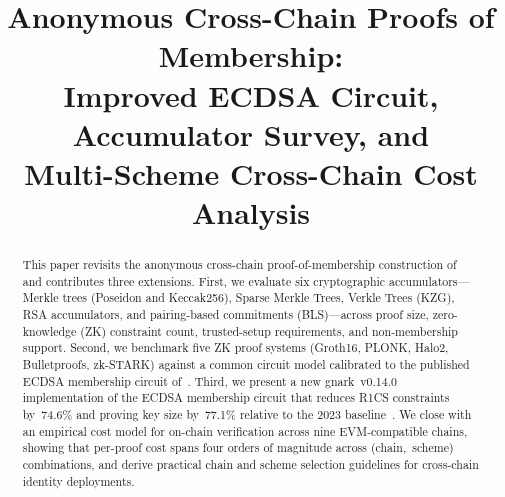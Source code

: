 \documentclass[conference]{IEEEtran}
\begin{document}
\title{Anonymous Cross-Chain Proofs of Membership:\\
Improved ECDSA Circuit, Accumulator Survey, and\\
Multi-Scheme Cross-Chain Cost Analysis}

\author{
  \and
}

\maketitle

\begin{abstract}
This paper revisits the anonymous cross-chain proof-of-membership
construction of~\cite{Kravchenko2023} and contributes three extensions.
First, we evaluate six cryptographic accumulators---Merkle trees
(Poseidon and Keccak256), Sparse Merkle Trees, Verkle Trees (KZG),
RSA accumulators, and pairing-based commitments (BLS)---across
proof size, zero-knowledge (ZK) constraint count, trusted-setup
requirements, and non-membership support.
Second, we benchmark five ZK proof systems (Groth16, PLONK,
Halo2, Bulletproofs, zk-STARK) against a common circuit model
calibrated to the published ECDSA membership circuit
of~\cite{Kravchenko2023}.
Third, we present a new gnark~v0.14.0 implementation of the ECDSA
membership circuit that reduces R1CS constraints by~74.6\% and proving
key size by~77.1\% relative to the 2023 baseline~\cite{Kravchenko2023}.
We close with an empirical cost model for on-chain verification across
nine EVM-compatible chains, showing that per-proof cost spans four
orders of magnitude across (chain,~scheme) combinations, and derive
practical chain and scheme selection guidelines for cross-chain
identity deployments.
\end{abstract}

\end{document}
